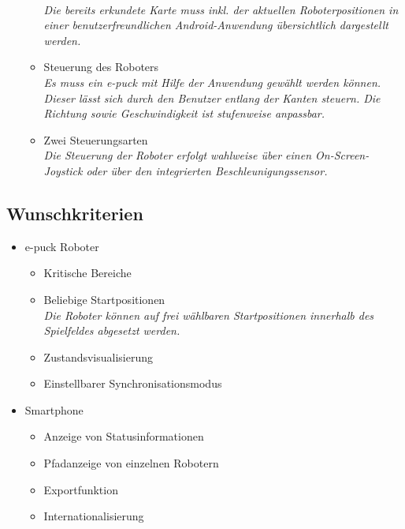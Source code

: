 \documentclass[10pt,a4paper]{article}
\begin{document}
\begin{itemize}
\begin{itemize}
						\\ \textsl{Die bereits erkundete Karte muss inkl. der aktuellen Roboterpositionen in einer
							benutzerfreundlichen Android-Anwendung übersichtlich dargestellt werden.}		
					\item Steuerung des Roboters
						\\ \textsl{Es muss ein e-puck mit Hilfe der Anwendung gewählt werden können. Dieser lässt sich
							durch den Benutzer entlang der Kanten steuern. Die Richtung sowie Geschwindigkeit ist
							stufenweise anpassbar.}		
					\item Zwei Steuerungsarten
						\\ \textsl{Die Steuerung der Roboter erfolgt wahlweise über einen On-Screen- Joystick oder über
							den integrierten Beschleunigungssensor.}											
				\end{itemize}
			\end{itemize}
		\subsection{Wunschkriterien}
			\begin{itemize}
				\item e-puck Roboter
				\begin{itemize}
					\item Kritische Bereiche
					\item Beliebige Startpositionen
						\\ \textsl{Die Roboter können auf frei wählbaren Startpositionen innerhalb des Spielfeldes
							abgesetzt werden.}
					\item Zustandsvisualisierung	
					\item Einstellbarer Synchronisationsmodus
				\end{itemize}
				\item Smartphone
				\begin{itemize}
					\item Anzeige von Statusinformationen
					\item Pfadanzeige von einzelnen Robotern					
					\item Exportfunktion
					\item Internationalisierung										
				\end{itemize}
			\end{itemize}
\end{document}
